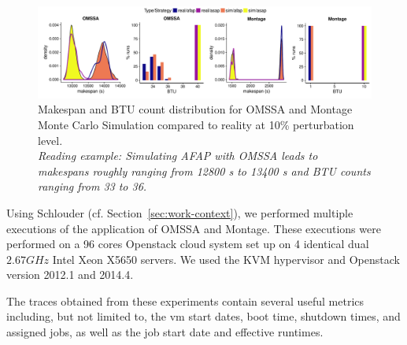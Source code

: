 \documentclass[10pt,conference,compsocconf]{IEEEtran}
\begin{document}
\begin{figure}
	\includegraphics[width=\textwidth]{gfx/fit_plot.pdf}
	\caption[caption]{Makespan and BTU count distribution for OMSSA and Montage Monte
	  Carlo Simulation compared to reality at 10\% perturbation level.\\ 
	  \textit{Reading example: Simulating AFAP with OMSSA leads to makespans 
	  roughly ranging from 12800 s to 13400 s and BTU counts ranging from 33 to 36.}
	}
	\label{fig:fit}
\end{figure}


Using Schlouder (cf. Section~\ref{sec:work-context}),
we performed multiple executions of the
application of OMSSA and Montage. These executions were performed on a 96 cores
Openstack cloud system set up on 4 identical dual $2.67GHz$ Intel Xeon X5650
servers. We used the KVM hypervisor and Openstack version 2012.1 and 2014.4.

The traces obtained  from  these  experiments contain  several
useful metrics  including, but  not limited  to, the  \ac{vm} start  dates, boot
time, shutdown  times, and assigned  jobs, as well as  the job start  date and
effective  runtimes.

\end{document}
